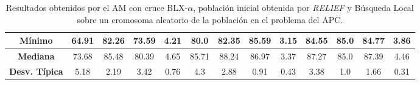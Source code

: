 \documentclass[11pt,a4paper]{article}
\begin{document}
\begin{table}[H]
{\begin{tabular}{c|c|c|c|c|c|c|c|c|c|c|c|c|}
\multicolumn{1}{|c|}{\textbf{Mínimo}}       & 64.91             & 82.26                   & 73.59         & 4.21       & 80.0              & 82.35          & 85.59         & 3.15       & 84.55             & 85.0           & 84.77         & 3.86       \\ \hline
\multicolumn{1}{|c|}{\textbf{Mediana}}      & 73.68             & 85.48                   & 80.39         & 4.65       & 85.71             & 88.24          & 86.97         & 3.37       & 87.27             & 85.0           & 87.39         & 4.46       \\ \hline
\multicolumn{1}{|c|}{\textbf{Desv. Típica}} & 5.18              & 2.19                    & 3.42          & 0.76       & 4.3               & 2.88           & 0.91          & 0.43       & 3.38              & 1.0            & 1.66          & 0.31       \\ \hline
\end{tabular}
}%
\caption{Resultados obtenidos por el AM con cruce BLX-$\alpha$, población inicial obtenida por \textit{RELIEF} y Búsqueda Local
sobre un cromosoma aleatorio  de la población en el problema del APC.}
\end{table}
\end{document}
